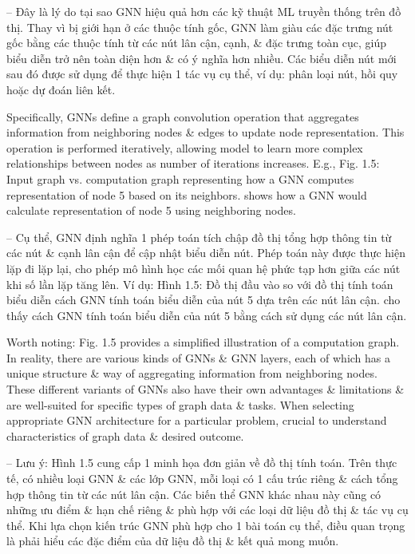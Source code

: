 \documentclass{article}
\begin{document}
\begin{itemize}
\begin{itemize}
        -- Đây là lý do tại sao GNN hiệu quả hơn các kỹ thuật ML truyền thống trên đồ thị. Thay vì bị giới hạn ở các thuộc tính gốc, GNN làm giàu các đặc trưng nút gốc bằng các thuộc tính từ các nút lân cận, cạnh, \& đặc trưng toàn cục, giúp biểu diễn trở nên toàn diện hơn \& có ý nghĩa hơn nhiều. Các biểu diễn nút mới sau đó được sử dụng để thực hiện 1 tác vụ cụ thể, ví dụ: phân loại nút, hồi quy hoặc dự đoán liên kết.

        Specifically, GNNs define a graph convolution operation that aggregates information from neighboring nodes \& edges to update node representation. This operation is performed iteratively, allowing model to learn more complex relationships between nodes as number of iterations increases. E.g., {\sf Fig. 1.5: Input graph vs. computation graph representing how a GNN computes representation of node 5 based on its neighbors.} shows how a GNN would calculate representation of node 5 using neighboring nodes.

        -- Cụ thể, GNN định nghĩa 1 phép toán tích chập đồ thị tổng hợp thông tin từ các nút \& cạnh lân cận để cập nhật biểu diễn nút. Phép toán này được thực hiện lặp đi lặp lại, cho phép mô hình học các mối quan hệ phức tạp hơn giữa các nút khi số lần lặp tăng lên. Ví dụ: {\sf Hình 1.5: Đồ thị đầu vào so với đồ thị tính toán biểu diễn cách GNN tính toán biểu diễn của nút 5 dựa trên các nút lân cận.} cho thấy cách GNN tính toán biểu diễn của nút 5 bằng cách sử dụng các nút lân cận.

        Worth noting: {\sf Fig. 1.5} provides a simplified illustration of a computation graph. In reality, there are various kinds of GNNs \& GNN layers, each of which has a unique structure \& way of aggregating information from neighboring nodes. These different variants of GNNs also have their own advantages \& limitations \& are well-suited for specific types of graph data \& tasks. When selecting appropriate GNN architecture for a particular problem, crucial to understand characteristics of graph data \& desired outcome.

        -- Lưu ý: {\sf Hình 1.5} cung cấp 1 minh họa đơn giản về đồ thị tính toán. Trên thực tế, có nhiều loại GNN \& các lớp GNN, mỗi loại có 1 cấu trúc riêng \& cách tổng hợp thông tin từ các nút lân cận. Các biến thể GNN khác nhau này cũng có những ưu điểm \& hạn chế riêng \& phù hợp với các loại dữ liệu đồ thị \& tác vụ cụ thể. Khi lựa chọn kiến trúc GNN phù hợp cho 1 bài toán cụ thể, điều quan trọng là phải hiểu các đặc điểm của dữ liệu đồ thị \& kết quả mong muốn.


\end{itemize}
\end{itemize}
\end{document}
